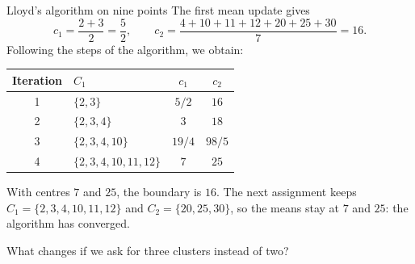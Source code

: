 \documentclass[a4paper,12pt,oneside]{report}
\begin{document}
\begin{framedexample}{Lloyd's algorithm on nine points}
The first mean update gives
\[
  c_1=\frac{2+3}{2}=\frac52,\qquad
  c_2=\frac{4+10+11+12+20+25+30}{7}=16.
\]
Following the steps of the algorithm, we obtain:
\begin{center}
\begin{tabular}{c|l|cc}
  Iteration & $C_1$ & $c_1$ & $c_2$\\
  \hline
  1 & $\{2,3\}$ & $5/2$ & $16$\\
  2 & $\{2,3,4\}$ & $3$ & $18$\\
  3 & $\{2,3,4,10\}$ & $19/4$ & $98/5$\\
  4 & $\{2,3,4,10,11,12\}$ & $7$ & $25$
\end{tabular}
\end{center}
\par\noindent\begin{minipage}{\linewidth}
With centres $7$ and $25$, the boundary is $16$. The next assignment
keeps $C_1=\{2,3,4,10,11,12\}$ and $C_2=\{20,25,30\}$, so the
means stay at $7$ and $25$: the algorithm has converged.
\begin{center}
\end{center}
\end{minipage}
\end{framedexample}
\endgroup

What changes if we ask for three clusters instead of two?
\end{document}
